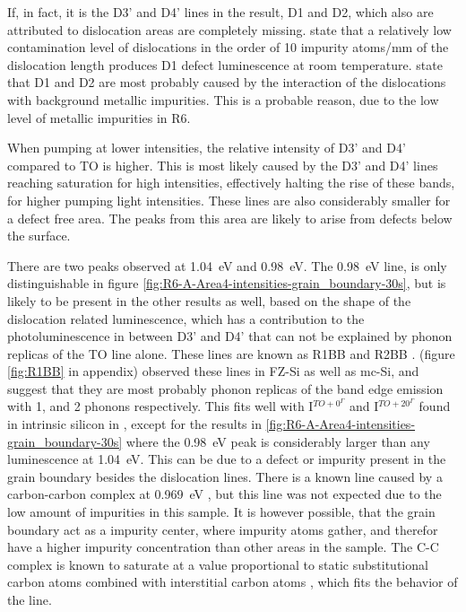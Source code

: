 If, in fact, it is the D3' and D4' lines in the result, D1 and D2, which also are attributed to dislocation areas are completely missing. \cite{kitler02} state that a relatively low contamination level of dislocations in the order of 10 impurity atoms/mm of the dislocation length produces D1 defect luminescence at room temperature. \cite{arguirov07} state that D1 and D2 are most probably caused by the interaction of the dislocations with background metallic impurities. This is a probable reason, due to the low level of metallic impurities in R6.

When pumping at lower intensities, the relative intensity of D3' and D4' compared to TO is higher. This is most likely caused by the D3' and D4' lines reaching saturation for high intensities, effectively halting the rise of these bands, for higher pumping light intensities. These lines are also considerably smaller for a defect free area. The peaks from this area are likely to arise from defects below the surface. 

There are two peaks observed at 1.04~eV and 0.98~eV. The 0.98~eV line, is only distinguishable in figure \ref{fig:R6-A-Area4-intensities-grain_boundary-30s}, but is likely to be present in the other results as well, based on the shape of the dislocation related luminescence, which has a contribution to the photoluminescence in between D3' and D4' that can not be explained by phonon replicas of the TO line alone. These lines are known as R1BB and R2BB \cite{arguirov02,arguirov03}. \cite{arguirov03} (figure \ref{fig:R1BB} in appendix) observed these lines in FZ-Si as well as mc-Si, and suggest that they are most probably phonon replicas of the band edge emission with 1, and 2 phonons respectively. This fits well with I$^{TO+0^\Gamma}$ and I$^{TO+20^\Gamma}$ found in intrinsic silicon in \cite{dean67}, except for the results in \ref{fig:R6-A-Area4-intensities-grain_boundary-30s} where the 0.98~eV peak is considerably larger than any luminescence at 1.04~eV. This can be due to a defect or impurity present in the grain boundary besides the dislocation lines. There is a known line caused by a carbon-carbon complex at 0.969~eV \cite{davies88}, but this line was not expected due to the low amount of impurities in this sample. It is however possible, that the grain boundary act as a impurity center, where impurity atoms gather, and therefor have a higher impurity concentration than other areas in the sample. The C-C complex is known to saturate at a value proportional to static substitutional carbon atoms combined with interstitial carbon atoms \cite{weber86}, which fits the behavior of the line. 

